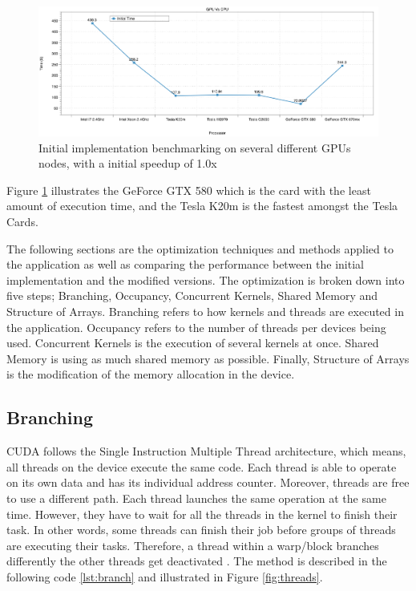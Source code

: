   \begin{figure}[htbp]
	\centering
		\includegraphics[width=1.0\textwidth]{Figures/gpu_initial.png}
		\smallskip
	\caption[Initial GPU results]{Initial implementation benchmarking on several different GPUs nodes, with a initial speedup of 1.0x}
	\label{fig:iniresults}
\end{figure}

Figure \ref{fig:iniresults} illustrates the GeForce GTX 580 which is the card with the least amount of execution time, and the Tesla K20m is the fastest amongst the Tesla Cards. 

The following sections are the optimization techniques and methods applied to the application as well as comparing the performance between the initial implementation and the modified versions. The optimization is broken down into five steps; Branching, Occupancy, Concurrent Kernels, Shared Memory and Structure of Arrays. Branching refers to how kernels and threads are executed in the application. Occupancy refers to the number of threads per devices being used. Concurrent Kernels is the execution of several kernels at once. Shared Memory is using as much shared memory as possible. Finally, Structure of Arrays is the modification of the memory allocation in the device.

 \subsection{Branching}
 
 CUDA follows the Single Instruction Multiple Thread architecture, which means, all threads on the device execute the same code. Each thread is able to operate on its own data and has its individual address counter. Moreover, threads are free to use a different path. Each thread launches the same operation at the same time. However, they have to wait for all the threads in the kernel to finish their task. In other words, some threads can finish their job before  groups of threads are executing their tasks. Therefore, a thread within a warp/block branches differently the other threads get deactivated \cite{hoermanngpu}. The method is described in the following code \ref{lst:branch} and illustrated in Figure \ref{fig:threads}.

